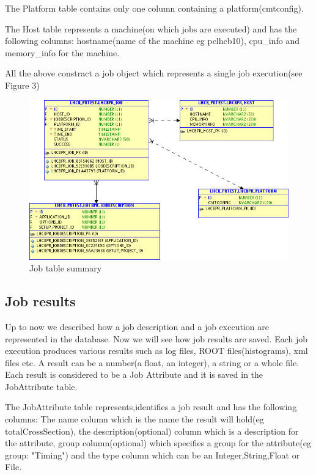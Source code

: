 \documentclass{lhcbnote}
\begin{document}
\vspace{4 mm}

The Platform table contains only one column containing a platform(cmtconfig).

\vspace{4 mm}

The Host table represents a machine(on which jobs are executed) and has the following columns:
hostname(name of the machine eg pclhcb10), cpu\_info and memory\_info for the machine.

\vspace{6 mm}

All the above constract a job object which represents a single job execution(see Figure 3)


\begin{figure}[ht!]
\centering
\includegraphics[width=170mm]{job.png}
\caption{Job table summary}
\label{overflow}
\end{figure}

\subsection{Job results}

Up to now we described how a job description and a job execution are represented in the database. 
Now we will see how job results are saved.
Each job execution produces various results such as log files, ROOT files(histograms), xml files etc.
A result can be a number(a float, an integer), a string or a whole file. Each result is considered 
to be a Job Attribute and it is saved in the JobAttribute table.

\vspace{4 mm}

The JobAttribute table represents,identifies a job result and has the following columns:
The name column which is the name the result will hold(eg totalCrossSection), the description(optional) 
column which is a description for the attribute, group column(optional) which specifies a group for 
the attribute(eg group: "Timing") and the type column which can be an Integer,String,Float or File. 
\end{document}
